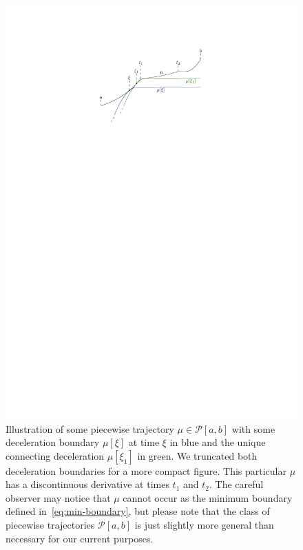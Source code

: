 \documentclass[a4paper]{article}
\theoremstyle{definition}
\theoremstyle{plain}
\begin{document}
\begin{figure}
  \centering
  \includegraphics[scale=1.1]{figures/motion/rough/deceleration-boundary}
  \caption{Illustration of some piecewise trajectory $\mu \in \mathcal{P}[a,b]$ with
    some deceleration boundary $\mu[\xi]$ at time $\xi$ in blue and the unique
    connecting deceleration $\mu[\xi_{1}]$ in green. We truncated both
    deceleration boundaries for a more compact figure. This particular $\mu$ has a
    discontinuous derivative at times $t_{1}$ and $t_{2}$. The careful observer
    may notice that $\mu$ cannot occur as the minimum boundary defined in~\eqref{eq:min-boundary}, but
    please note that the class of piecewise trajectories $\mathcal{P}[a,b]$ is
    just slightly more general than necessary for our current purposes.}%
  \label{fig:deceleration-boundary}
\end{figure}
\end{document}
